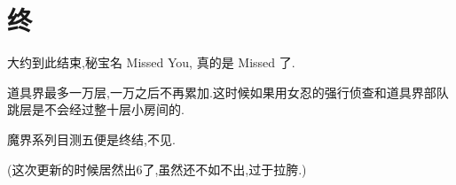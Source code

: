 \newpage

\section{终}

大约到此结束,秘宝名 Missed You, 真的是 Missed 了.

道具界最多一万层,一万之后不再累加.这时候如果用女忍的强行侦查和道具界部队跳层是不会经过整十层小房间的.

魔界系列目测五便是终结,不见.

(这次更新的时候居然出6了,虽然还不如不出,过于拉胯.)
